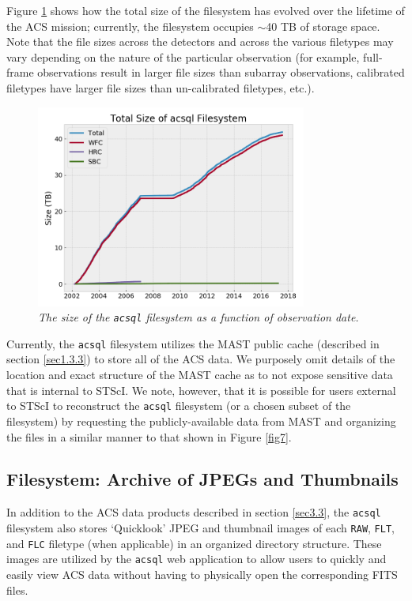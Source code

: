 \documentclass[10pt,journal,compsoc]{IEEEtran}
\begin{document}
Figure \ref{fig8} shows how the total size of the filesystem has evolved over the lifetime of the ACS mission; currently, the filesystem occupies $\sim${40} TB of storage space.
Note that the file sizes across the detectors and across the various filetypes may vary depending on the nature of the particular observation (for example, full-frame observations
result in larger file sizes than subarray observations, calibrated filetypes have larger file sizes than un-calibrated filetypes, etc.).

\begin{figure}[!h]
\centering
\includegraphics[width=3.5in]{./figures/filesystem_size.png}
\caption{\textit{The size of the \texttt{acsql} filesystem as a function of observation
date.}}
\label{fig8}
\end{figure}

Currently, the \texttt{acsql} filesystem utilizes the MAST public cache (described in section \ref{sec1.3.3}) to store all of the ACS data.  We purposely omit details of the location
and exact structure of the MAST cache as to not expose sensitive data that is internal to STScI.  We note, however, that it is possible for users external to STScI to reconstruct the
\texttt{acsql} filesystem (or a chosen subset of the filesystem) by requesting the publicly-available data from MAST and organizing the files in a similar manner to that shown in Figure \ref{fig7}.


\subsection{Filesystem: Archive of JPEGs and Thumbnails} \label{sec3.4}

In addition to the ACS data products described in section \ref{sec3.3}, the \texttt{acsql} filesystem also stores `Quicklook' JPEG and thumbnail images of each
\texttt{RAW}, \texttt{FLT}, and \texttt{FLC} filetype (when applicable) in an organized directory structure.  These images are utilized by the \texttt{acsql} web application to allow users to
quickly and easily view ACS data without having to physically open the corresponding FITS files.
\end{document}
